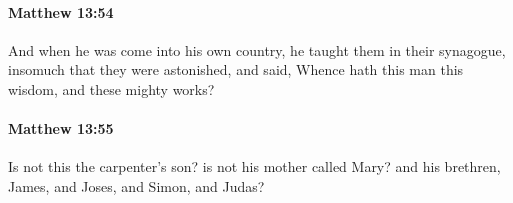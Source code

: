 		\paragraph{Matthew 13:54} %
			\label{MATTHEW-13-54}

			And when he was come into his own country, he taught them in their synagogue, insomuch that they were astonished, and said, Whence hath this man this wisdom, and these mighty works?

			\begin{framed}
			\scriptsize
				\begin{compactdesc}
					\item[SBLG] 
				\end{compactdesc}
			\end{framed}

		\paragraph{Matthew 13:55} %
			\label{MATTHEW-13-55}

			Is not this the carpenter's son? is not his mother called Mary? and his brethren, James, and Joses, and Simon, and Judas?

